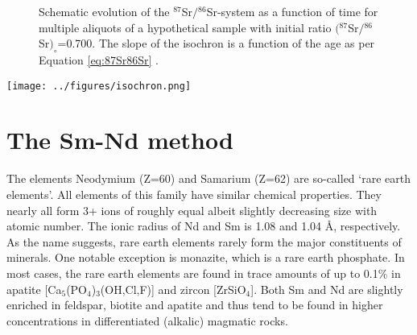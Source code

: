\ifpdf
\ifuclnotes
\begin{figure}[!ht]
  \centering
  \def\svgwidth{.7\textwidth}
  
  \caption{Schematic evolution of the $^{87}$Sr$/{}^{86}$Sr-system as
    a function of time for multiple aliquots of a hypothetical sample
    with initial ratio $({}^{87}$Sr$/{}^{86}$Sr$)_\circ$=0.700. The
    slope of the isochron is a function of the age as per Equation
    \ref{eq:87Sr86Sr} \citep[modified from][]{allegre2008}.}
  \label{fig:isochron}
\end{figure}
\else %
\begin{figure}[!ht]
\noindent\begin{minipage}[t]{.6\textwidth}
\strut\vspace*{-\baselineskip}\newline
\def\svgwidth{\textwidth}

\end{minipage}
\begin{minipage}[t]{.4\textwidth}
  \label{fig:isochron}
\end{minipage}
\end{figure}
\fi %
\else
\texttt{[image: ../figures/isochron.png]}
  \label{fig:isochron}
\fi

\section{The Sm-Nd method}
\label{sec:Sm-Nd}

The elements Neodymium (Z=60) and Samarium (Z=62) are so-called `rare
earth elements'.  All elements of this family have similar chemical
properties. They nearly all form 3+ ions of roughly equal albeit
slightly decreasing size with atomic number.  The ionic radius of Nd
and Sm is 1.08 and 1.04 \AA, respectively.  As the name suggests, rare
earth elements rarely form the major constituents of minerals.  One
notable exception is monazite, which is a rare earth phosphate. In
most cases, the rare earth elements are found in trace amounts of up
to 0.1\% in apatite [Ca$_5$(PO$_4$)$_3$(OH,Cl,F)] and zircon
[ZrSiO$_4$]. Both Sm and Nd are slightly enriched in feldspar, biotite
and apatite and thus tend to be found in higher concentrations in
differentiated (alkalic) magmatic rocks.\\

